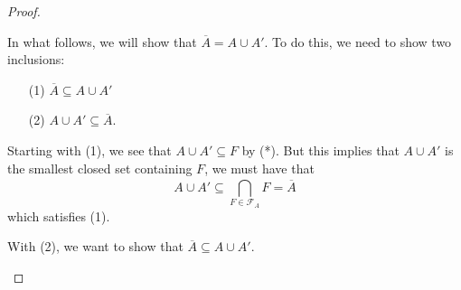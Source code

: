 \documentclass[a4paper]{article}
\begin{document}
\begin{proof}
\begin{enumerate}
    In what follows, we will show that \( \overline{A} = A \cup A' \). To do this, we need to show two inclusions:
    \begin{enumerate}
        \item[(1)] \( \overline{A} \subseteq  A \cup A'  \)
        \item[(2)] \( A \cup A'  \subseteq \overline{A}\).
    \end{enumerate}
    Starting with (1), we see that \( A \cup A'  \subseteq F \) by (*). But this implies that \( A \cup A' \) is the smallest closed set containing \( F  \), we must have that 
    \[  A \cup A' \subseteq  \bigcap_{ F \in {\mathcal{F}}_{A} }^{  }  F = \overline{A} \]
    which satisfies (1).
    
    With (2), we want to show that \( \overline{A} \subseteq A \cup A' \).

\end{enumerate}
\end{proof}
\end{document}
